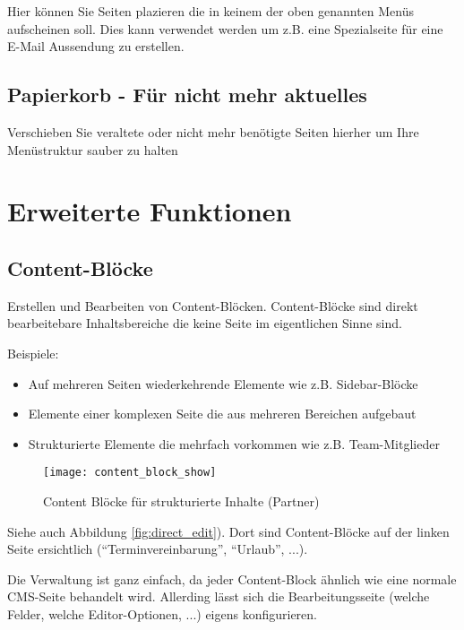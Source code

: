 \documentclass[article, a4paper, oneside, 11pt]{memoir}
\begin{document}
Hier können Sie Seiten plazieren die in keinem der oben genannten Menüs aufscheinen soll. Dies kann verwendet werden um z.B. eine Spezialseite für eine E-Mail Aussendung zu erstellen.

\section{Papierkorb - Für nicht mehr aktuelles}

Verschieben Sie veraltete oder nicht mehr benötigte Seiten hierher um Ihre Menüstruktur sauber zu halten

\chapter{Erweiterte Funktionen}

\section{Content-Blöcke}
\label{sec:contentblock}

Erstellen und Bearbeiten von Content-Blöcken. Content-Blöcke sind direkt bearbeitebare Inhaltsbereiche die keine Seite im eigentlichen Sinne sind.

Beispiele:

\begin{itemize}
\item Auf mehreren Seiten wiederkehrende Elemente wie z.B. Sidebar-Blöcke
\item Elemente einer komplexen Seite die aus mehreren Bereichen aufgebaut
\item Strukturierte Elemente die mehrfach vorkommen wie z.B. Team-Mitglieder
\end{itemize}

\begin{figure}[htp]
\centering
\texttt{[image: content\_block\_show]}
\caption{Content Blöcke für strukturierte Inhalte (Partner)}
\label{fig:content_block_show}
\end{figure}

Siehe auch Abbildung \vref{fig:direct_edit}). Dort sind Content-Blöcke auf der linken Seite ersichtlich ("`Terminvereinbarung"', "`Urlaub"', ...).

Die Verwaltung ist ganz einfach, da jeder Content-Block ähnlich wie eine normale CMS-Seite behandelt wird.
Allerding lässt sich die Bearbeitungsseite (welche Felder, welche Editor-Optionen, ...) eigens konfigurieren.
\end{document}
